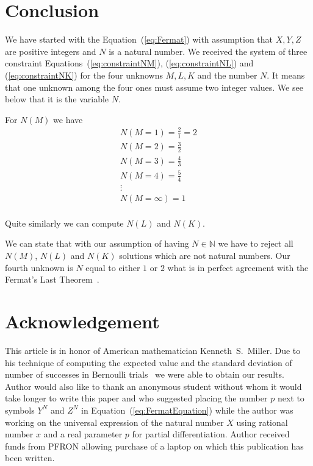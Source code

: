 \documentclass[12pt]{article}
\numberwithin{equation}{section}
\begin{document}
\section{Conclusion}\label{sec:conclusion}

We have started with the Equation~(\ref{eq:Fermat}) with assumption that $X, Y, Z$ are positive 
integers and $N$ is a natural number.
We received the system of three constraint E\-qu\-a\-tions~(\ref{eq:constraintNM}), (\ref{eq:constraintNL}) and (\ref{eq:constraintNK})
for the four unknowns $M, L, K$ and the number $N$\@.
It means that one unknown among the four ones must assume two integer values. We see below that it is the variable $N$\@.

For $N(M)$ we have
\begin{eqnarray}
\label{eq:constraint}
N(M=1) = \frac{2}{1} = 2    \\ \nonumber
N(M=2) = \frac{3}{2}        \\ \nonumber
N(M=3) = \frac{4}{3}        \\ \nonumber
N(M=4) = \frac{5}{4}        \\ \nonumber
\vdots                      \\ \nonumber
N(M=\infty) = 1             \\ \nonumber
\end{eqnarray}


Quite similarly we can compute $N(L)$ and $N(K)$\@.

We can state that with our assumption of having $N \in \mathbb{N}$ we have to reject
all $N(M)$, $N(L)$ and $N(K)$ solutions which are not natural numbers.
Our fourth unknown is $N$ equal to either $1$ or $2$ what is in perfect agreement with the Fermat's Last Theorem~\cite{FLT_Wikipedia}\@.


\section{Acknowledgement}\label{sec:acknowledgement}

    This article is in honor of American mathematician Kenneth~S.\ Mil\-ler. Due to his 
    technique of computing the expected value and the standard deviation of number of 
    successes in Bernoulli trials~\cite{book_by_Miller}
    we were able to obtain our results. 
    Author would also like to thank an
    anonymous student without whom it would take longer to
    write this paper and who suggested placing the number $p$ next to symbols $Y^{N}$ and $Z^{N}$
    in Equation~(\ref{eq:FermatEquation}) while the author was working on the universal expression 
    of the natural number $X$ using rational number $x$ and a real parameter $p$ for partial differentiation. 
    Author received funds from PFRON allowing purchase of a laptop on which this publication has been written.   
\end{document}
